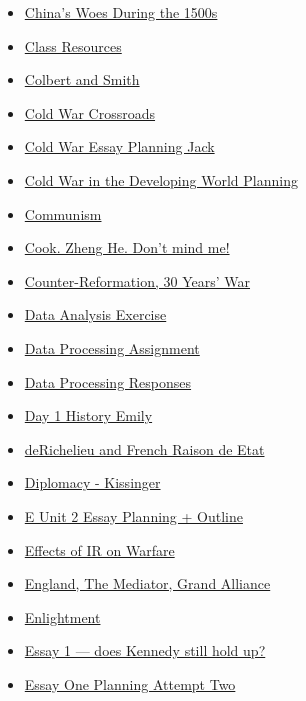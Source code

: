 \documentclass[11pt]{article}
\begin{document}
\begin{itemize}
\begin{itemize}
\begin{itemize}
\item \href{history/history10/KBhHIST201ChinaWoes1500.org}{China's Woes During the 1500s}
\item \href{history/history10/KBe2020hist201refClassResources.org}{Class Resources}
\item \href{history/history10/KBhHIST201ColbertAndSmith.org}{Colbert and Smith}
\item \href{history/history10/KBhHIST201ColdWarCrossroads.org}{Cold War Crossroads}
\item \href{history/history10/KBhHIST201ColdWarEssayPlanningJack.org}{Cold War Essay Planning Jack}
\item \href{history/history10/KBxColdWarDevelopingWorldPlanning.org}{Cold War in the Developing World Planning}
\item \href{history/history10/KBhHIST201Communism.org}{Communism}
\item \href{history/history10/KBhHIST201CookZhengHe.org}{Cook. Zheng He. Don't mind me!}
\item \href{history/history10/KBhHIST201CounterReformation.org}{Counter-Reformation, 30 Years' War}
\item \href{history/history10/KBxDataAnalysisExercise.org}{Data Analysis Exercise}
\item \href{history/history10/KBDataProcessingRett.org}{Data Processing Assignment}
\item \href{history/history10/KBdataProsResponses.org}{Data Processing Responses}
\item \href{history/history10/KB20200825102230.org}{Day 1 History Emily}
\item \href{history/history10/KBhHIST201FrenchRichelieuAndRaisonDeEtat.org}{deRichelieu and French Raison de Etat}
\item \href{history/history10/KBhHIST201Kissinger.org}{Diplomacy - Kissinger}
\item \href{history/history10/KBe20hist201retUnit2Essay.org}{E Unit 2 Essay Planning + Outline}
\item \href{history/history10/KBhHIST201IRonWarfare.org}{Effects of IR on Warfare}
\item \href{history/history10/KBhHIST201EnglandMediator.org}{England, The Mediator, Grand Alliance}
\item \href{history/history10/KBhHIST201Enlightenment.org}{Enlightment}
\item \href{history/history10/KBhHIST201KennedyStillHoldsUp.org}{Essay 1 --- does Kennedy still hold up?}
\item \href{history/history10/KBEssay1PlanningAttemp2.org}{Essay One Planning Attempt Two}

\end{itemize}
\end{itemize}
\end{itemize}
\end{document}
